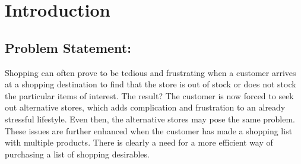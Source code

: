 \documentclass[10pt, a4paper, twocolumn]{scrartcl}
\begin{document}
%		
%		
%
%		
%		
%		

\twocolumn
\section{Introduction}

	\subsection{Problem Statement:} 
	
		Shopping can often prove to be tedious and frustrating when a customer arrives at a shopping destination to find that the store is out of stock or does not stock the particular items of interest. The result? The customer is now forced to seek out alternative stores, which adds complication and frustration to an already stressful lifestyle. Even then, the alternative stores may pose the same problem. These issues are further enhanced when the customer has made a shopping list with multiple products. There is clearly a need for a more efficient way of purchasing a list of shopping desirables. \\
		
\end{document}

